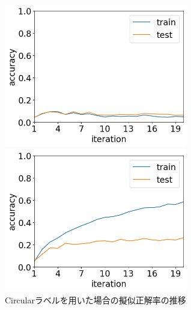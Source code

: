 \documentclass[11pt,a4paper,uplatex]{ujarticle}
\begin{document}
  \begin{figure}[tbp]
    \begin{minipage}[b]{0.495\textwidth}
      \centering
      \includegraphics[keepaspectratio, width=80mm]{Images/python/accuracy_202402052108.png}
    \end{minipage}
    \begin{minipage}[b]{0.495\textwidth}
      \centering
      \includegraphics[keepaspectratio, width=80mm]{Images/python/accuracy_202402052149.png}
    \end{minipage}
    \caption{Circularラベルを用いた場合の擬似正解率の推移}
  \end{figure}
  \clearpage
\end{document}
